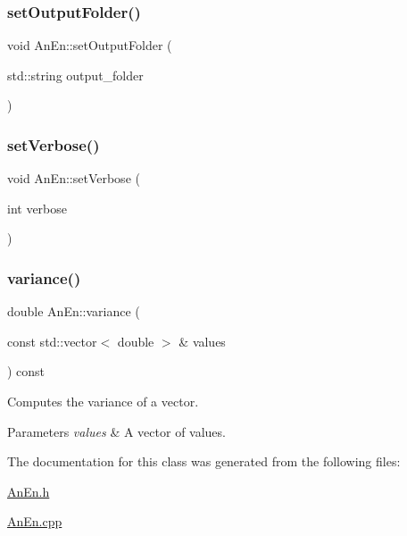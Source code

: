 \mbox{\label{class_an_en_a829929424b823440c7e10dbec2979a45}} 
\subsubsection{\texorpdfstring{set\+Output\+Folder()}{setOutputFolder()}}
{\footnotesize\ttfamily void An\+En\+::set\+Output\+Folder (\begin{DoxyParamCaption}\item[{std\+::string}]{output\+\_\+folder }\end{DoxyParamCaption})}

\mbox{\label{class_an_en_af1009201b008da7395f1c1ed0ec287cd}} 
\subsubsection{\texorpdfstring{set\+Verbose()}{setVerbose()}}
{\footnotesize\ttfamily void An\+En\+::set\+Verbose (\begin{DoxyParamCaption}\item[{int}]{verbose }\end{DoxyParamCaption})}

\mbox{\label{class_an_en_abf793d4b89afaf4d647df74c172a6018}} 
\subsubsection{\texorpdfstring{variance()}{variance()}}
{\footnotesize\ttfamily double An\+En\+::variance (\begin{DoxyParamCaption}\item[{const std\+::vector$<$ double $>$ \&}]{values }\end{DoxyParamCaption}) const}

Computes the variance of a vector. 
\begin{DoxyParams}{Parameters}
{\em values} & A vector of values. \\
\hline
\end{DoxyParams}


The documentation for this class was generated from the following files\+:\begin{DoxyCompactItemize}
\item 
\mbox{\hyperlink{_an_en_8h}{An\+En.\+h}}\item 
\mbox{\hyperlink{_an_en_8cpp}{An\+En.\+cpp}}\end{DoxyCompactItemize}
